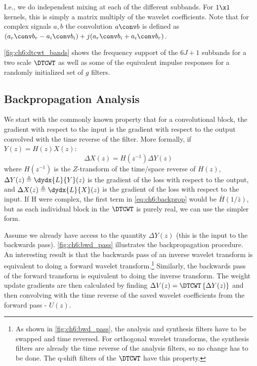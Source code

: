 I.e., we do independent mixing at each of the different subbands. For $1\x 1$
kernels, this is simply a matrix multiply of the wavelet coefficients. Note that
for complex signals $a, b$ the convolution $a \conv b$ is defined as $(a_r \conv
b_r - a_i \conv b_i) + j(a_r \conv b_i + a_i \conv b_r)$.

\autoref{fig:ch6:dtcwt_bands} shows the frequency support of the $6J+1$ subbands
for a two scale $\DTCWT$ as well as some of the equivalent impulse responses for
a randomly initialized set of $g$ filters.



\subsection{Backpropagation Analysis}
We start with the commonly known property that for a convolutional block, the
gradient with respect to the input is the gradient with respect to the output
convolved with the time reverse of the filter. More formally, if 
$Y(z) = H(z) X(z)$:
%
\begin{equation}\label{eq:ch6:backprop}
  \Delta X(z) = H(z^{-1}) \Delta Y(z)
\end{equation}
%
where $H(z^{-1})$ is the $Z$-transform of the time/space reverse of $H(z)$,
$\Delta Y(z) \triangleq \dydx{L}{Y}(z)$ is the gradient of the loss with respect
to the output, and $\Delta X(z) \triangleq \dydx{L}{X}(z)$ is the gradient of
the loss with respect to the input. If H were complex, the first term in
\autoref{eq:ch6:backprop} would be $\bar{H}(1/\bar{z})$, but as each individual
block in the $\DTCWT$ is purely real, we can use the simpler form. 

Assume we already have access to the quantity $\Delta Y(z)$ (this is the input
to the backwards pass). \autoref{fig:ch6:bwd_pass} illustrates the
backpropagation procedure. An interesting result is that the backwards pass of
an inverse wavelet transform is equivalent to doing a forward wavelet
transform.\footnote{As shown in \autoref{fig:ch6:bwd_pass}, the analysis and
synthesis filters have to be swapped and time reversed. For orthogonal wavelet
transforms, the synthesis filters are already the time reverse of the analysis
filters, so no change has to be done. The q-shift filters of the $\DTCWT$
\cite{kingsbury_design_2003} have this property.} Similarly, the backwards pass
of the forward transform is equivalent to doing the inverse transform. The
weight update gradients are then calculated by finding 
$\Delta V(z) = \DTCWT\left\{ \Delta Y(z) \right\}$ and then convolving with the 
time reverse of the saved wavelet coefficients from the forward pass - $U(z)$.

